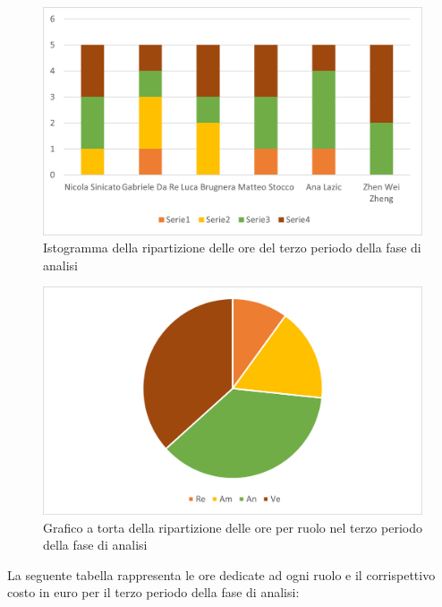 \begin{figure}[H]
    \centering
    \includegraphics[scale=0.6]{img/grafi preventivo/istogrammi/analisi/periodo3.png}
    \caption{Istogramma della ripartizione delle ore del terzo periodo della fase di analisi}
\end{figure}
\begin{figure}[H]
    \centering
    \includegraphics[scale=0.6]{img/grafi preventivo/torta/analisi/periodo3.png}
    \caption{Grafico a torta della ripartizione delle ore per ruolo nel terzo periodo della fase di analisi}
\end{figure}
La seguente tabella rappresenta le ore dedicate ad ogni ruolo e il corrispettivo costo in euro per il terzo periodo della fase di analisi:
